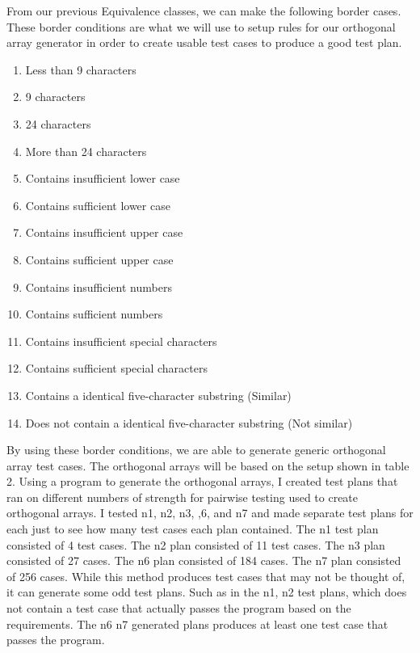 \documentclass[12pt,letterpaper]{article}
\begin{document}
From our previous Equivalence classes, we can make the following border cases. These border conditions
are what we will use to setup rules for our orthogonal array generator in order to create usable test
cases to produce a good test plan.

\begin{enumerate}
\item Less than 9 characters
\item 9 characters
\item 24 characters
\item More than 24 characters
\item Contains insufficient lower case
\item Contains sufficient lower case
\item Contains insufficient upper case
\item Contains sufficient upper case
\item Contains insufficient numbers
\item Contains sufficient numbers
\item Contains insufficient special characters
\item Contains sufficient special characters
\item Contains a identical five-character substring (Similar)
\item Does not contain a identical five-character substring (Not similar)
\end{enumerate}

By using these border conditions, we are able to generate generic orthogonal array test cases.  The orthogonal arrays will be based on the setup
shown in table 2. Using a program to generate the orthogonal arrays, I created test plans that ran on different numbers of
strength for pairwise testing used to create orthogonal arrays. I tested n1, n2, n3, ,6, and n7 and made separate test plans for each
just to see how many test cases each plan contained. The n1 test plan consisted of 4 test cases. The n2 plan consisted of 11 test cases.
The n3 plan consisted of 27 cases. The n6 plan consisted of 184 cases. The n7 plan consisted of 256 cases. While this method produces
test cases that may not be thought of, it can generate some odd test plans. Such as in the n1, n2 test plans, which does not
contain a test case that actually passes the program based on the requirements. The n6 n7 generated plans produces at least one
test case that passes the program.
\end{document}
